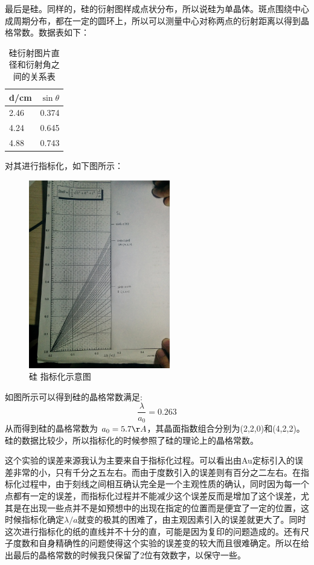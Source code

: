 \documentclass[aps,pre,12pt,preprint,onecolumn,showpacs,showkeys,UTF8]{revtex4-1}
\begin{document}
最后是硅。同样的，硅的衍射图样成点状分布，所以说硅为单晶体。斑点围绕中心成周期分布，都在一定的圆环上，所以可以测量中心对称两点的衍射距离以得到晶格常数。数据表如下：
\begin{center}
	\begin{table}[h]
		\caption{硅衍射图片直径和衍射角之间的关系表}
		\begin{tabularx}{10cm}{XX}
			\hline
			\hline
			d/cm&$\sin{\theta}$\\
			\hline
			2.46&0.374\\
			4.24&0.645\\
			4.88&0.743\\
			\hline
			\hline
		\end{tabularx}
	\end{table}
\end{center}
对其进行指标化，如下图所示：
\begin{figure}[h]
	\begin{center}
	\includegraphics[width=0.55\textwidth]{Si.png}
		\caption{\label{fig:exp2}硅 指标化示意图}
	\end{center}
\end{figure}
\newpage
如图所示可以得到硅的晶格常数满足:
\begin{equation}
	\frac{\lambda}{a_0}=0.263
\end{equation}
从而得到硅的晶格常数为 $a_0=5.7\AA$，其晶面指数组合分别为(2,2,0)和(4,2,2)。硅的数据比较少，所以指标化的时候参照了硅的理论上的晶格常数。

这个实验的误差来源我认为主要来自于指标化过程。可以看出由Au定标引入的误差非常的小，只有千分之五左右。而由于度数引入的误差则有百分之二左右。在指标化过程中，由于刻线之间相互确认完全是一个主观性质的确认，同时因为每一个点都有一定的误差，而指标化过程并不能减少这个误差反而是增加了这个误差，尤其是在出现一些点并不是如预想中的出现在指定的位置而是便宜了一定的位置，这时候指标化确定$\lambda/a$就变的极其的困难了，由主观因素引入的误差就更大了。同时这次进行指标化的纸的直线并不十分的直，可能是因为复印的问题造成的。还有尺子度数和自身精确性的问题使得这个实验的误差变的较大而且很难确定。所以在给出最后的晶格常数的时候我只保留了2位有效数字，以保守一些。
\end{document}
